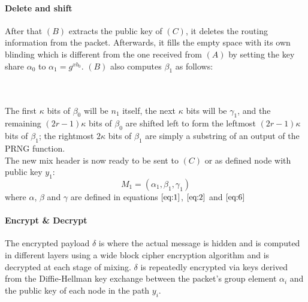 \paragraph{Delete and shift}
After that $(B)$ extracts the public key of $(C)$, it deletes the routing information from the packet. Afterwards, it fills the empty space with its own blinding which is different from the one received from $(A)$ by setting the key share $\alpha_0$ to $\alpha_1=g^{xb_0}$. $(B)$ also computes $\beta_1$ as follows:

\\~\\The first $\kappa$ bits of $\beta_0$ will be $n_{1}$ itself, the next $\kappa$ bits will be $\gamma_{1}$, and the remaining $(2r-1)\kappa$ bits of $\beta_0$ are shifted left to form the leftmost $(2r-1)\kappa$ bits of $\beta_{1}$; the rightmost $2\kappa$ bits of $\beta_{1}$ are simply a substring of an output of the PRNG function.
\\The new mix header is now ready to be sent to $(C)$ or as defined node with public key $y_1$:
$$M_1=(\alpha_1,\beta_1,\gamma_1)$$
where $\alpha$, $\beta$ and $\gamma$ are defined in equations $\ref{eq:1}$, $\ref{eq:2}$ and $\ref{eq:6}$
\paragraph{Encrypt \& Decrypt}
The encrypted payload $\delta$ is where the actual message is hidden and is computed in different layers using a wide block cipher encryption algorithm and is decrypted at each stage of mixing.
$\delta$ is repeatedly encrypted via keys derived from the Diffie-Hellman key exchange between the packet’s group element $\alpha_i$ and the public key of each node in the path $y_i$.

